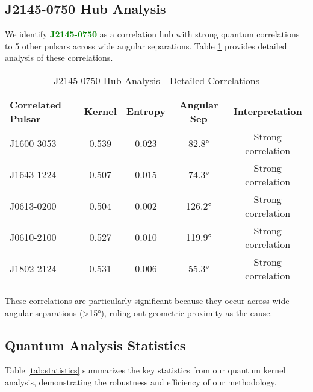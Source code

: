 \documentclass[12pt,a4paper]{article}
\newcommand{\pulsarJ}{\textcolor{green}{\textbf{J2145-0750}}}
\begin{document}
\subsection{J2145-0750 Hub Analysis}

We identify \pulsarJ{} as a correlation hub with strong quantum correlations to 5 other pulsars across wide angular separations. Table \ref{tab:j2145_hub} provides detailed analysis of these correlations.

\begin{table}[h]
\centering
\caption{J2145-0750 Hub Analysis - Detailed Correlations}
\label{tab:j2145_hub}
\begin{tabular}{@{}lcccc@{}}
\toprule
Correlated Pulsar & Kernel & Entropy & Angular Sep & Interpretation \\
\midrule
J1600-3053 & 0.539 & 0.023 & 82.8° & Strong correlation \\
J1643-1224 & 0.507 & 0.015 & 74.3° & Strong correlation \\
J0613-0200 & 0.504 & 0.002 & 126.2° & Strong correlation \\
J0610-2100 & 0.527 & 0.010 & 119.9° & Strong correlation \\
J1802-2124 & 0.531 & 0.006 & 55.3° & Strong correlation \\
\bottomrule
\end{tabular}
\end{table}

These correlations are particularly significant because they occur across wide angular separations (>15°), ruling out geometric proximity as the cause.

\subsection{Quantum Analysis Statistics}

Table \ref{tab:statistics} summarizes the key statistics from our quantum kernel analysis, demonstrating the robustness and efficiency of our methodology.
\end{document}
